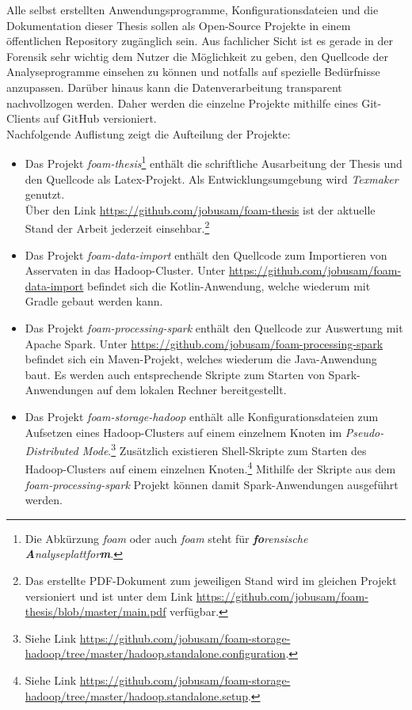 \noindent
Alle selbst erstellten Anwendungsprogramme, Konfigurationsdateien und die Dokumentation dieser Thesis sollen als Open-Source Projekte in einem öffentlichen Repository zugänglich sein. Aus fachlicher Sicht ist es gerade in der Forensik sehr wichtig dem Nutzer die Möglichkeit zu geben, den Quellcode der Analyseprogramme einsehen zu können und notfalls auf spezielle Bedürfnisse anzupassen. Darüber hinaus kann die Datenverarbeitung transparent nachvollzogen werden.
Daher werden die einzelne Projekte mithilfe eines Git-Clients auf GitHub versioniert.\\
Nachfolgende Auflistung zeigt die Aufteilung der Projekte:
\begin{itemize}
\item Das Projekt \textit{foam-thesis}\footnote{Die Abkürzung \textit{foam} oder auch \textit{\acrshort{foam}} steht für \textit{\textbf{fo}rensische \textbf{A}nalyseplattfor\textbf{m}}.} enthält die schriftliche Ausarbeitung der Thesis und den Quellcode als Latex-Projekt. Als Entwicklungsumgebung wird \textit{Texmaker} genutzt.\\
Über den Link \url{https://github.com/jobusam/foam-thesis} ist der aktuelle Stand der Arbeit jederzeit einsehbar.\footnote{Das erstellte PDF-Dokument zum jeweiligen Stand wird im gleichen Projekt versioniert und ist unter dem Link \url{https://github.com/jobusam/foam-thesis/blob/master/main.pdf} verfügbar.}

\item Das Projekt \textit{foam-data-import} enthält den Quellcode zum Importieren von Asservaten in das Hadoop-Cluster. Unter \url{https://github.com/jobusam/foam-data-import} befindet sich die Kotlin-Anwendung, welche wiederum mit Gradle gebaut werden kann.

\item Das Projekt \textit{foam-processing-spark} enthält den Quellcode zur Auswertung mit Apache Spark\texttrademark\thinspace. Unter \url{https://github.com/jobusam/foam-processing-spark} befindet sich ein Maven-Projekt, welches wiederum die Java-Anwendung baut. Es werden auch entsprechende Skripte zum Starten von Spark-Anwendungen auf dem lokalen Rechner bereitgestellt. 

\item Das Projekt \textit{foam-storage-hadoop} enthält alle Konfigurationsdateien zum Aufsetzen eines Hadoop-Clusters auf einem einzelnem Knoten im \textit{Pseudo-Distributed Mode}.\footnote{Siehe Link \url{https://github.com/jobusam/foam-storage-hadoop/tree/master/hadoop.standalone.configuration}.} Zusätzlich existieren Shell-Skripte zum Starten des Hadoop-Clusters auf einem einzelnen Knoten.\footnote{Siehe Link \url{https://github.com/jobusam/foam-storage-hadoop/tree/master/hadoop.standalone.setup}.} Mithilfe der Skripte aus dem \textit{foam-processing-spark} Projekt können damit Spark-Anwendungen ausgeführt werden.
\end{itemize}

